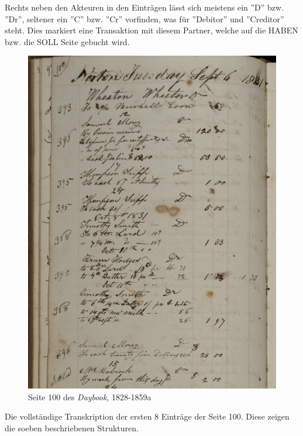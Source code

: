 \documentclass[12pt,a4paper]{article}
\begin{document}
Rechts neben den Akteuren in den Einträgen lässt sich meistens ein ''D'' bzw. ''Dr'', seltener ein ''C'' bzw. ''Cr'' vorfinden, was für ''Debitor'' und ''Creditor'' steht. Dies markiert eine Transaktion mit diesem Partner, welche auf die HABEN bzw. die SOLL Seite gebucht wird.
\begin{figure}[H]
\centering
	\includegraphics[width=1\textwidth]{img/wheaton_100_101.jpg}  
    \caption[Seite 100 des \textit{Daybook, \protect\url{http://hdl.handle.net/11040/17982}}, 1828-1859]{Seite 100 des \textit{Daybook}, 1828-1859a} \label{fig:wheaton}
\end{figure}
Die vollständige Transkription der ersten 8 Einträge der Seite 100. Diese zeigen die soeben beschriebenen Strukturen.
\\
\\
\end{document}

